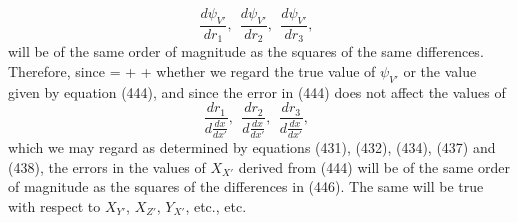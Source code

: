 \documentclass[12pt]{article}
\begin{document}
{$$\frac{d\psi_{V'}}{dr_1}, \ \ \frac{d\psi_{V'}}{dr_2}, \ \ \frac{d\psi_{V'}}{dr_3}, \ \ $$
will be of the same order of magnitude as the squares of the same differences. Therefore, since
\eqs {}=  +  +          \label{447}\eqe
whether we regard the true value of $\psi_{V'}$ or the value given by equation (444), and since the error in (444) does not affect the values of
$$ \frac{dr_1}{d\frac{dx}{dx'}},\ \ \frac{dr_2}{d\frac{dx}{dx'}},\ \ \frac{dr_3}{d\frac{dx}{dx'}},\ \ $$
which we may regard as determined by equations (431), (432), (434), (437) and (438), the errors in the values of $X_{X'}$ derived from (444) will be of the same order of magnitude as the squares of the differences in (446). The same will be true with respect to $X_{Y'}$, $X_{Z'}$, $Y_{X'}$, etc., etc.


}
\end{document}
